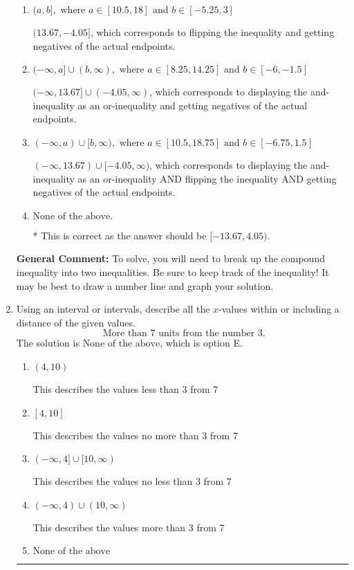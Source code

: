 \documentclass{extbook}[14pt]
\newcommand{\litem}[1]{\item #1

\rule{\textwidth}{0.4pt}}
\begin{document}
\begin{enumerate}
{\begin{enumerate}[label=\Alph*.]
$[13.67, -4.05)$, which is the correct interval but negatives of the actual endpoints.
\item \( (a, b], \text{ where } a \in [10.5, 18] \text{ and } b \in [-5.25, 3] \)

$(13.67, -4.05]$, which corresponds to flipping the inequality and getting negatives of the actual endpoints.
\item \( (-\infty, a] \cup (b, \infty), \text{ where } a \in [8.25, 14.25] \text{ and } b \in [-6, -1.5] \)

$(-\infty, 13.67] \cup (-4.05, \infty)$, which corresponds to displaying the and-inequality as an or-inequality and getting negatives of the actual endpoints.
\item \( (-\infty, a) \cup [b, \infty), \text{ where } a \in [10.5, 18.75] \text{ and } b \in [-6.75, 1.5] \)

$(-\infty, 13.67) \cup [-4.05, \infty)$, which corresponds to displaying the and-inequality as an or-inequality AND flipping the inequality AND getting negatives of the actual endpoints.
\item \( \text{None of the above.} \)

* This is correct as the answer should be $[-13.67, 4.05)$.
\end{enumerate}

\textbf{General Comment:} To solve, you will need to break up the compound inequality into two inequalities. Be sure to keep track of the inequality! It may be best to draw a number line and graph your solution.
}
\litem{
Using an interval or intervals, describe all the $x$-values within or including a distance of the given values.
\[ \text{ More than } 7 \text{ units from the number } 3. \]The solution is \( \text{None of the above} \), which is option E.\begin{enumerate}[label=\Alph*.]
\item \( (4, 10) \)

This describes the values less than 3 from 7
\item \( [4, 10] \)

This describes the values no more than 3 from 7
\item \( (-\infty, 4] \cup [10, \infty) \)

This describes the values no less than 3 from 7
\item \( (-\infty, 4) \cup (10, \infty) \)

This describes the values more than 3 from 7
\item \( \text{None of the above} \)


\end{enumerate}}
\end{enumerate}
\end{document}
